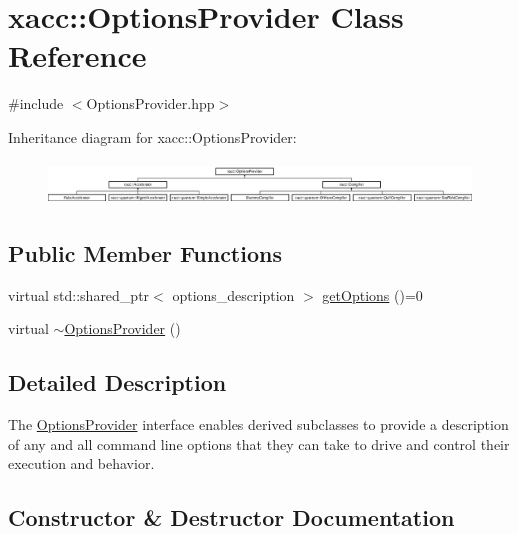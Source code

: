 \hypertarget{a02536}{}\section{xacc\+:\+:Options\+Provider Class Reference}
\label{a02536}


{\ttfamily \#include $<$Options\+Provider.\+hpp$>$}

Inheritance diagram for xacc\+:\+:Options\+Provider\+:\begin{figure}[H]
\begin{center}
\leavevmode
\includegraphics[height=1.148325cm]{a02536}
\end{center}
\end{figure}
\subsection*{Public Member Functions}
\begin{DoxyCompactItemize}
\item 
virtual std\+::shared\+\_\+ptr$<$ options\+\_\+description $>$ \hyperlink{a02536_a6d150954f852109bfe2c1ae90222926f}{get\+Options} ()=0
\item 
virtual \hyperlink{a02536_a7782757b419792ff346f563517eed8b8}{$\sim$\+Options\+Provider} ()
\end{DoxyCompactItemize}


\subsection{Detailed Description}
The \hyperlink{a02536}{Options\+Provider} interface enables derived subclasses to provide a description of any and all command line options that they can take to drive and control their execution and behavior. 

\subsection{Constructor \& Destructor Documentation}
\mbox{\label{a02536_a7782757b419792ff346f563517eed8b8}} 
